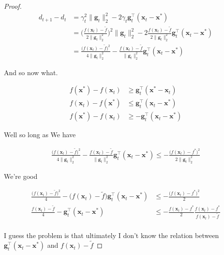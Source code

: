 \documentclass{article}
\begin{document}
\begin{proof}
	\begin{align}
		d_{t+1} - d_t &= \gamma_t^2 \|\mathbf{g}_t\|^2_2 - 2\gamma_t\mathbf{g}_t^\top(\mathbf{x}_t - \mathbf{x}^*)\\
		&= \bigg( \frac{f(\mathbf{x}_t) - \tilde{f}}{2\|\mathbf{g}_t\|^2_2} \bigg)^2 \|\mathbf{g}_t\|^2_2 - 2\frac{f(\mathbf{x}_t) - \tilde{f}}{2\|\mathbf{g}_t\|^2_2}\mathbf{g}_t^\top(\mathbf{x}_t - \mathbf{x}^*)\\
		&= \frac{\big(f(\mathbf{x}_t) - \tilde{f}\big)^2}{4\|\mathbf{g}_t\|^2_2}  - \frac{f(\mathbf{x}_t) - \tilde{f}}{\|\mathbf{g}_t\|^2_2}\mathbf{g}_t^\top(\mathbf{x}_t - \mathbf{x}^*)
	\end{align}
	
	And so now what. 

	\begin{align}
		f(\mathbf{x}^*) -  f(\mathbf{x}_t) &\ge \mathbf{g}_t^\top(\mathbf{x}^*-\mathbf{x}_t)\\
		f(\mathbf{x}_t) - f(\mathbf{x}^*)  &\le \mathbf{g}_t^\top(\mathbf{x}_t - \mathbf{x}^*)\\
		f(\mathbf{x}^*) -  f(\mathbf{x}_t)  &\ge -\mathbf{g}_t^\top(\mathbf{x}_t - \mathbf{x}^*)
	\end{align}
	
	Well so long as We have 
	
	\begin{align}
		\frac{\big(f(\mathbf{x}_t) - \tilde{f}\big)^2}{4\|\mathbf{g}_t\|^2_2}  - \frac{f(\mathbf{x}_t) - \tilde{f}}{\|\mathbf{g}_t\|^2_2}\mathbf{g}_t^\top(\mathbf{x}_t - \mathbf{x}^*) \le -\frac{\big(f(\mathbf{x}_t)-f^*\big)^2}{2\|\mathbf{g}_t\|^2_2}
	\end{align}
	
	We're good

	\begin{align}
		\frac{\big(f(\mathbf{x}_t) - \tilde{f}\big)^2}{4}  - \big(f(\mathbf{x}_t) - \tilde{f}\big)\mathbf{g}_t^\top(\mathbf{x}_t - \mathbf{x}^*) &\le -\frac{\big(f(\mathbf{x}_t)-f^*\big)^2}{2}\\
		\frac{f(\mathbf{x}_t) - \tilde{f}}{4}  - \mathbf{g}_t^\top(\mathbf{x}_t - \mathbf{x}^*) &\le -\frac{f(\mathbf{x}_t)-f^*}{2} \frac{f(\mathbf{x}_t)-f^*}{f(\mathbf{x}_t) - \tilde{f}} \\
	\end{align}
	
	I guess the problem is that ultimately I don't know the relation between $\mathbf{g}^\top_t(\mathbf{x}_t - \mathbf{x}^*)$ and $f(\mathbf{x}_t) - \tilde{f}$
	

\end{proof}
\end{document}
